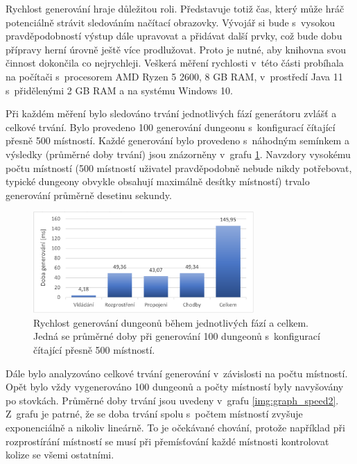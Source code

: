 Rychlost generování hraje důležitou roli.
Představuje totiž čas, který může hráč potenciálně strávit sledováním načítací obrazovky.
Vývojář si bude s~vysokou pravděpodobností výstup dále upravovat a přidávat další prvky, což bude dobu přípravy herní úrovně ještě více prodlužovat.
Proto je nutné, aby knihovna svou činnost dokončila co nejrychleji.
Veškerá měření rychlosti v~této části probíhala na počítači s~procesorem AMD Ryzen 5 2600, 8 GB RAM, v~prostředí Java 11 s~přidělenými 2 GB RAM a na systému Windows 10.
\par
Při každém měření bylo sledováno trvání jednotlivých fází generátoru zvlášť a celkové trvání.
Bylo provedeno 100 generování dungeonu s~konfigurací čítající přesně 500 místností.
Každé generování bylo provedeno s~náhodným semínkem a výsledky (průměrné doby trvání) jsou znázorněny v~grafu \ref{img:graph_speed}.
Navzdory vysokému počtu místností (500 místností uživatel pravděpodobně nebude nikdy potřebovat, typické dungeony obvykle obsahují maximálně desítky místností) trvalo generování průměrně desetinu sekundy.
\begin{figure}[ht]
    \centering
    \includegraphics[width=0.75\textwidth]{obrazky/graph_speed.pdf}
    \caption{Rychlost generování dungeonů během jednotlivých fází a celkem. Jedná se průměrné doby při generování 100 dungeonů s~konfigurací čítající přesně 500 místností.}
    \label{img:graph_speed}
\end{figure}
\par
Dále bylo analyzováno celkové trvání generování v~závislosti na počtu místností.
Opět bylo vždy vygenerováno 100 dungeonů a počty místností byly navyšovány po stovkách.
Průměrné doby trvání jsou uvedeny v~grafu \ref{img:graph_speed2}.
Z~grafu je patrné, že se doba trvání spolu s~počtem místností zvyšuje exponenciálně a nikoliv lineárně.
To je očekávané chování, protože například při rozprostírání místností se musí při přemísťování každé místnosti kontrolovat kolize se všemi ostatními.

